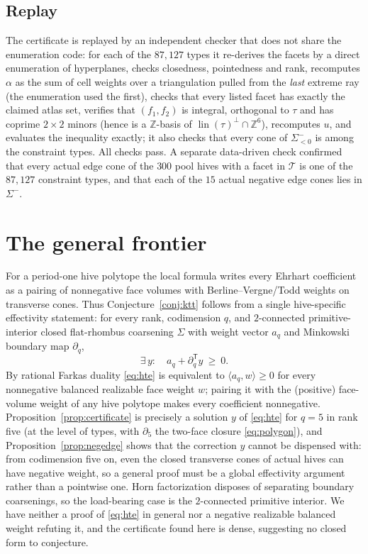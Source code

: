 \documentclass[11pt]{amsart}
\theoremstyle{definition}
\newcommand{\Z}{\mathbb{Z}}
\begin{document}
\subsection{Replay}
The certificate is replayed by an independent checker that does not share the
enumeration code: for each of the $87{,}127$ types it re-derives the facets by
a direct enumeration of hyperplanes, checks closedness, pointedness and rank,
recomputes $\alpha$ as the sum of cell weights over a triangulation pulled from
the \emph{last} extreme ray (the enumeration used the first), checks that every
listed facet has exactly the claimed atlas set, verifies that $(f_1,f_2)$ is
integral, orthogonal to $\tau$ and has coprime $2\times2$ minors (hence is a
$\Z$-basis of $\operatorname{lin}(\tau)^{\perp}\cap\Z^{6}$), recomputes $u$,
and evaluates the inequality exactly; it also checks that every cone of
$\Sigma^{-}_{<0}$ is among the constraint types. All checks pass. A separate
data-driven check confirmed that every actual edge cone of the $300$ pool hives
with a facet in $\mathcal T$ is one of the $87{,}127$ constraint types, and that
each of the $15$ actual negative edge cones lies in $\Sigma^{-}$.

\section{The general frontier}\label{sec:frontier}

For a period-one hive polytope the local formula writes every Ehrhart coefficient
as a pairing of nonnegative face volumes with Berline--Vergne/Todd weights on
transverse cones. Thus Conjecture~\ref{conj:ktt} follows from a single
hive-specific effectivity statement: for every rank, codimension $q$, and
$2$-connected primitive-interior closed flat-rhombus coarsening $\Sigma$ with
weight vector $a_q$ and Minkowski boundary map $\partial_q$,
\begin{equation}\label{eq:hte}
  \exists\, y:\quad a_q+\partial_q^{\mathsf T}y\ \ge\ 0. \tag{HTE}
\end{equation}
By rational Farkas duality \eqref{eq:hte} is equivalent to
$\langle a_q,w\rangle\ge 0$ for every nonnegative balanced realizable face weight
$w$; pairing it with the (positive) face-volume weight of any hive polytope makes
every coefficient nonnegative. Proposition~\ref{prop:certificate} is precisely a
solution $y$ of \eqref{eq:hte} for $q=5$ in rank five (at the level of types,
with $\partial_5$ the two-face closure \eqref{eq:polygon}), and
Proposition~\ref{prop:negedge} shows that the correction $y$ cannot be dispensed
with: from codimension five on, even the closed transverse cones of actual hives
can have negative weight, so a general proof must be a global effectivity
argument rather than a pointwise one. Horn factorization \cite{KTT2006,KTTfactor}
disposes of separating boundary coarsenings, so the load-bearing case is the
$2$-connected primitive interior. We have neither a proof of \eqref{eq:hte} in
general nor a negative realizable balanced weight refuting it, and the
certificate found here is dense, suggesting no closed form to conjecture.
\end{document}
